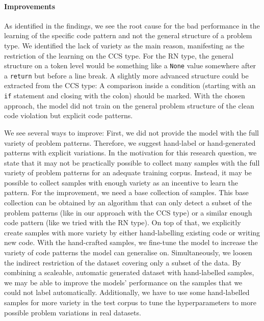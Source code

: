 \paragraph{Improvements}
As identified in the findings, we see the root cause for the bad performance in the learning of the specific code pattern and not the general structure of a problem type. We identified the lack of variety as the main reason, manifesting as the restriction of the learning on the CCS type. For the RN type, the general structure on a token level would be something like a \texttt{None} value somewhere after a \texttt{return} but before a line break. A slightly more advanced structure could be extracted from the CCS type: A comparison inside a condition (starting with an \texttt{if} statement and closing with the colon) should be marked. With the chosen approach, the model did not train on the general problem structure of the clean code violation but explicit code patterns. 

We see several ways to improve:
First, we did not provide the model with the full variety of problem patterns. Therefore, we suggest hand-label or hand-generated patterns with explicit variations.
In the motivation for this research question, we state that it may not be practically possible to collect many samples with the full variety of problem patterns for an adequate training corpus. Instead, it may be possible to collect samples with enough variety as an incentive to learn the pattern. For the improvement, we need a base collection of samples. This base collection can be obtained by an algorithm that can only detect a subset of the problem patterns (like in our approach with the CCS type) or a similar enough code pattern (like we tried with the RN type). On top of that, we explicitly create samples with more variety by either hand-labelling existing code or writing new code. With the hand-crafted samples, we fine-tune the model to increase the variety of code patterns the model can generalise on. Simultaneously, we loosen the indirect restriction of the dataset covering only a subset of the data. By combining a scaleable, automatic generated dataset with hand-labelled samples, we may be able to improve the models' performance on the samples that we could not label automatically. Additionally, we have to use some hand-labelled samples for more variety in the test corpus to tune the hyperparameters to more possible problem variations in real datasets.

